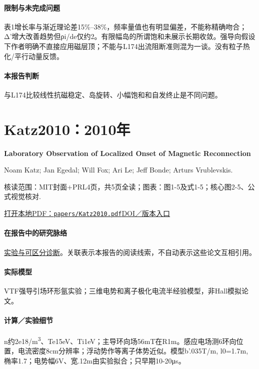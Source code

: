 \paragraph{限制与未完成问题}表1增长率与渐近理论差15\%–38\%，频率量值也有明显偏差，不能称精确吻合；Δ'增大改善趋势但ρi/de仅约2。有限幅岛的所谓饱和未展示长期收敛。强导向假设下作者明确不直接应用磁层顶；不能与L174出流阻断准则混为一谈。没有粒子热化/平行动量反馈。

\paragraph{本报告判断}与L174比较线性抗磁稳定、岛旋转、小幅饱和和自发终止是不同问题。

\section{Katz2010：2010年}\label{paper:Katz2010}

\textbf{Laboratory Observation of Localized Onset of Magnetic Reconnection}\citep{Katz2010}\

Noam Katz;  Jan Egedal;  Will Fox;  Ari Le;  Jeff Bonde;  Arturs Vrublevskis.

\textsf{核读范围：}MIT封面+PRL4页，共5页全读；\textsf{图表：}图1-5及式1-5；核心图2-5、公式视觉核对.

\href{run:papers/Katz2010.pdf}{打开本地PDF：\texttt{papers/Katz2010.pdf}}\quad\href{https://doi.org/10.1103/physrevlett.104.255004}{DOI／版本入口}

\paragraph{在报告中的研究脉络}\hyperref[story:diagnostic]{实验与可区分诊断}。关联表示本报告的阅读线索，不自动表示这些论文互相引用。

\paragraph{实际模型}VTF强导引场环形氩实验；三维电势和离子极化电流半经验模型，非Hall模拟论文。

\paragraph{计算／实验细节}n约2e18/m\textsuperscript{3}、Te15eV、Ti1eV；主导环向场56mT在R1m。感应电场测6环向位置，电流密度8cm分辨率；浮动势作等离子体势近似。模型b'.035T/m, l0=1.7m, 椭率1.7；电势幅6V、宽.12m由实验拟合；只早期10-20μs。


